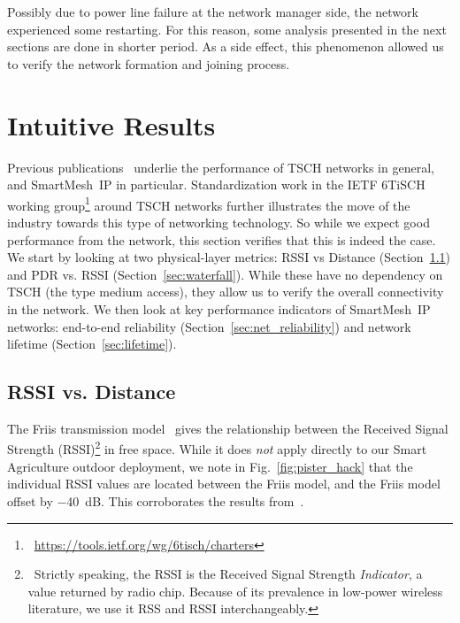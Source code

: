 \documentclass{sig-alternate}
\newcommand{\smip}                {SmartMesh~IP\xspace}
\begin{document}
Possibly due to power line failure at the network manager side, the network experienced some restarting.
For this reason, some analysis presented in the next sections are done in shorter period.
As a side effect, this phenomenon allowed us to verify the network formation and joining process.

\section{Intuitive Results}
\label{sec:intuitive}

Previous publications~\cite{watteyne16peach,watteyne10mitigating,watteyne09reliability,watteyne15industrial} underlie the performance of TSCH networks in general, and \smip in particular.
Standardization work in the IETF 6TiSCH working group\footnote{~\url{https://tools.ietf.org/wg/6tisch/charters}} around TSCH networks further illustrates the move of the industry towards this type of networking technology.
So while we expect good performance from the network, this section verifies that this is indeed the case.
We start by looking at two physical-layer metrics: RSSI vs Distance (Section~\ref{sec:rssi_distance}) and PDR vs. RSSI (Section~\ref{sec:waterfall}).
While these have no dependency on TSCH (the type medium access), they allow us to verify the overall connectivity in the network.
We then look at key performance indicators of \smip networks: end-to-end reliability (Section~\ref{sec:net_reliability}) and network lifetime (Section~\ref{sec:lifetime}).

\subsection{RSSI vs. Distance}
\label{sec:rssi_distance}

The Friis transmission model~\cite{saunders07antennas} gives the relationship between the Received Signal Strength (RSSI)\footnote{~Strictly speaking, the RSSI is the Received Signal Strength \textit{Indicator}, a value returned by radio chip. Because of its prevalence in low-power wireless literature, we use it RSS and RSSI interchangeably.} in free space.
While it does \textit{not} apply directly to our Smart Agriculture outdoor deployment, we note in Fig.~\ref{fig:pister_hack} that the individual RSSI values are located between the Friis model, and the Friis model offset by $-$40~dB.
This corroborates the results from~\cite{zats10wireless}.
\end{document}
